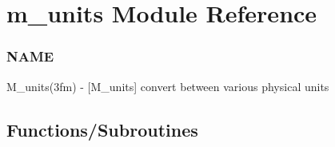 \hypertarget{namespacem__units}{}\section{m\+\_\+units Module Reference}
\label{namespacem__units}


\subsubsection*{N\+A\+ME}

M\+\_\+units(3fm) -\/ \mbox{[}M\+\_\+units\mbox{]} convert between various physical units  


\subsection*{Functions/\+Subroutines}
